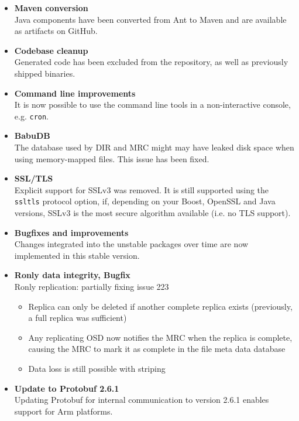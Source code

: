 \documentclass[a4paper,10pt]{book}
\begin{document}
\begin{itemize}
  \item \textbf{Maven conversion}\\
      Java components have been converted from Ant to Maven and are available
      as artifacts on GitHub.
  \item \textbf{Codebase cleanup}\\
      Generated code has been excluded from the repository, as well as previously
      shipped binaries.
  \item \textbf{Command line improvements}\\
      It is now possible to use the command line tools in a non-interactive
      console, e.g. \texttt{cron}.
  \item \textbf{BabuDB}\\
      The database used by DIR and MRC might may have leaked disk space when using
      memory-mapped files. This issue has been fixed.
  \item \textbf{SSL/TLS}\\
      Explicit support for SSLv3 was removed. It is still supported using the
      \texttt{ssltls} protocol option, if, depending on your Boost, OpenSSL and Java
      versions, SSLv3 is the most secure algorithm available (i.e. no TLS support).
  \item \textbf{Bugfixes and improvements}\\
      Changes integrated into the unstable packages over time are now implemented
      in this stable version.
  \item \textbf{Ronly data integrity, Bugfix}\\
      Ronly replication: partially fixing issue 223
      \begin{itemize}
        \item Replica can only be deleted if another complete replica exists (previously, a full replica was sufficient)
        \item Any replicating OSD now notifies the MRC when the replica is complete, causing the MRC to mark it as complete in the file meta data database
        \item Data loss is still possible with striping
      \end{itemize}
  \item \textbf{Update to Protobuf 2.6.1}\\
      Updating Protobuf for internal communication to version 2.6.1 enables
      support for Arm platforms.

\end{itemize}
\end{document}
